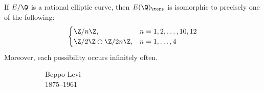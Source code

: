 \begin{frame}[plain]
\begin{thm}
If $E/\Q$ is a rational elliptic curve, then $E(\Q)_\tors$ is isomorphic to precisely one of the following:
	\[
	\begin{cases}
	\Z/n\Z, & n=1,2,\ldots,10,12 \\
	\Z/2\Z \oplus \Z/2n\Z, & n=1,\ldots,4
	\end{cases}
	\]
Moreover, each possibility occurs infinitely often.
\end{thm}
	\begin{figure}[h]
	\centering
	\begin{subfigure}{0.3\textwidth}
	\captionsetup{labelformat=empty}
	\centering
	\caption{\hspace{0.5cm}Beppo Levi \\ \hspace{0.8cm}1875--1961}
	\end{subfigure}
	\begin{subfigure}{0.3\textwidth}
	\captionsetup{labelformat=empty}
	\centering

\end{subfigure}
\end{figure}
\end{frame}
